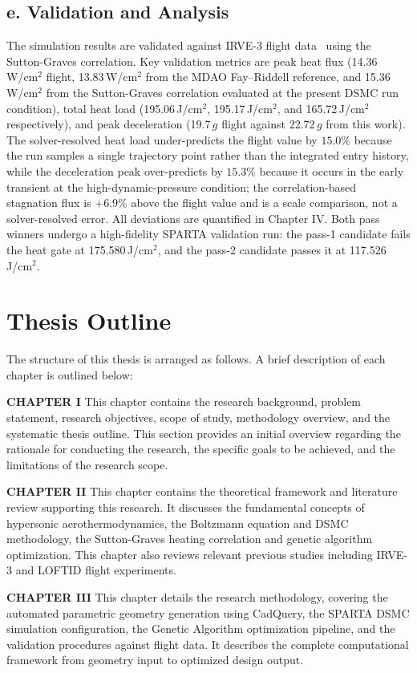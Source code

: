 \subsection*{e. Validation and Analysis}
The simulation results are validated against IRVE-3 flight data~\cite{rapisarda2023mdao} using the Sutton-Graves correlation. Key validation metrics are peak heat flux (14.36\,W/cm$^2$ flight, 13.83\,W/cm$^2$ from the MDAO Fay--Riddell reference, and 15.36\,W/cm$^2$ from the Sutton-Graves correlation evaluated at the present DSMC run condition), total heat load (195.06\,J/cm$^2$, 195.17\,J/cm$^2$, and 165.72\,J/cm$^2$ respectively), and peak deceleration (19.7\,$g$ flight against 22.72\,$g$ from this work). The solver-resolved heat load under-predicts the flight value by $15.0\%$ because the run samples a single trajectory point rather than the integrated entry history, while the deceleration peak over-predicts by $15.3\%$ because it occurs in the early transient at the high-dynamic-pressure condition; the correlation-based stagnation flux is $+6.9\%$ above the flight value and is a scale comparison, not a solver-resolved error. All deviations are quantified in Chapter IV. Both pass winners undergo a high-fidelity SPARTA validation run: the pass-1 candidate fails the heat gate at 175.580\,J/cm$^2$, and the pass-2 candidate passes it at 117.526\,J/cm$^2$.

\section{Thesis Outline}
The structure of this thesis is arranged as follows. A brief description of each chapter is outlined below:

\textbf{CHAPTER I} This chapter contains the research background, problem statement, research objectives, scope of study, methodology overview, and the systematic thesis outline. This section provides an initial overview regarding the rationale for conducting the research, the specific goals to be achieved, and the limitations of the research scope.

\textbf{CHAPTER II} This chapter contains the theoretical framework and literature review supporting this research. It discusses the fundamental concepts of hypersonic aerothermodynamics, the Boltzmann equation and DSMC methodology, the Sutton-Graves heating correlation and genetic algorithm optimization. This chapter also reviews relevant previous studies including IRVE-3 and LOFTID flight experiments.

\textbf{CHAPTER III} This chapter details the research methodology, covering the automated parametric geometry generation using CadQuery, the SPARTA DSMC simulation configuration, the Genetic Algorithm optimization pipeline, and the validation procedures against flight data. It describes the complete computational framework from geometry input to optimized design output.

